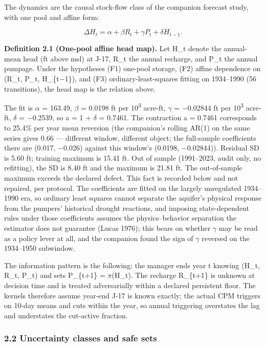 \documentclass[11pt]{article}
\begin{document}
The dynamics are the causal stock-flow class of the companion forecast
study, with one pool and affine form:

\[\Delta H_t = \alpha + \beta R_t + \gamma P_t + \delta H_{t-1}.\]

\textbf{Definition 2.1 (One-pool affine head map).} Let H\_t denote the
annual-mean head (ft above msl) at J-17, R\_t the annual recharge, and
P\_t the annual pumpage. Under the hypotheses (F1) one-pool storage,
(F2) affine dependence on (R\_t, P\_t, H\_\{t\ensuremath{-}1\}), and (F3)
ordinary-least-squares fitting on 1934--1990 (56 transitions), the head
map is the relation above.

The fit is \ensuremath{\alpha} = 163.49, \ensuremath{\beta} = 0.0198 ft per 10\textsuperscript{3} acre-ft, \ensuremath{\gamma} = \ensuremath{-}0.02844 ft
per 10\textsuperscript{3} acre-ft, \ensuremath{\delta} = \ensuremath{-}0.2539, so a = 1 + \ensuremath{\delta} = 0.7461. The contraction a =
0.7461 corresponds to 25.4\% per year mean reversion (the companion's
rolling AR(1) on the same series gives 0.66 --- different window,
different object; the full-sample coefficients there are (0.017, \ensuremath{-}0.026)
against this window's (0.0198, \ensuremath{-}0.02844)). Residual SD is 5.60 ft;
training maximum is 15.41 ft. Out of sample (1991--2023, audit only, no
refitting), the SD is 8.40 ft and the maximum is 21.81 ft. The
out-of-sample maximum exceeds the declared defect. This fact is recorded
below and not repaired, per protocol. The coefficients are fitted on the
largely unregulated 1934--1990 era, so ordinary least squares cannot
separate the aquifer's physical response from the pumpers' historical
drought reactions, and imposing state-dependent rules under those
coefficients assumes the physics--behavior separation the estimator does
not guarantee (Lucas 1976); this bears on whether \ensuremath{\gamma} may be read as a
policy lever at all, and the companion found the sign of \ensuremath{\gamma} reversed on
the 1934--1950 subwindow.

The information pattern is the following: the manager ends year t
knowing (H\_t, R\_t, P\_t) and sets P\_\{t+1\} = \ensuremath{\pi}(H\_t). The recharge
R\_\{t+1\} is unknown at decision time and is treated adversarially
within a declared persistent floor. The kernels therefore assume
year-end J-17 is known exactly; the actual CPM triggers on 10-day means
and cuts within the year, so annual triggering overstates the lag and
understates the cut-active fraction.

\subsubsection{2.2 Uncertainty classes and safe
sets}\label{edw-uncertainty-classes-and-safe-sets}
\end{document}
